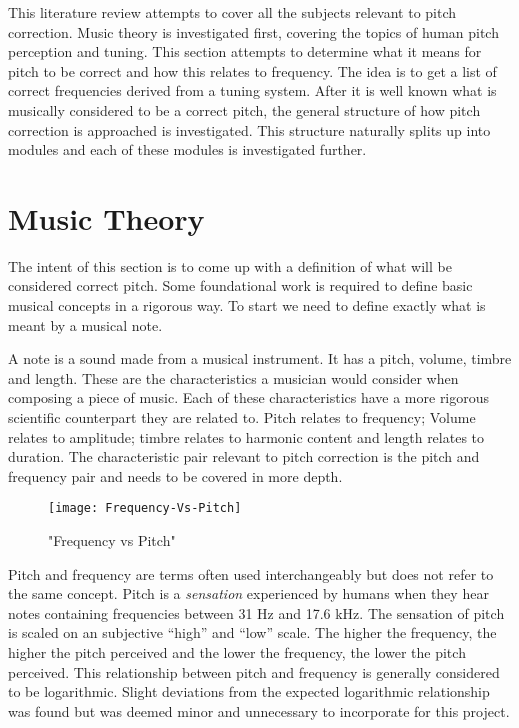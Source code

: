 
This literature review attempts to cover all the subjects relevant to pitch
correction. Music theory is investigated first, covering the topics of human
pitch perception and tuning. This section attempts to determine what it means for
pitch to be correct and how this relates to frequency. The idea is to get a list of
correct frequencies derived from a tuning system. After it is well known what
is musically considered to be a correct pitch, the general structure of how pitch
correction is approached is investigated. This structure naturally splits up into
modules and each of these modules is investigated further.

\section{Music Theory}

The intent of this section is to come up with a definition of what will be
considered correct pitch. Some foundational work is required to define basic
musical concepts in a rigorous way. To start we need to define exactly what is
meant by a musical note.

A note is a sound made from a musical instrument. It has a pitch, volume, timbre
and length. These are the characteristics a musician would consider when composing
a piece of music. Each of these characteristics have a more rigorous scientific
counterpart they are related to. Pitch relates to frequency; Volume relates to
amplitude; timbre relates to harmonic content and length relates to duration. The
characteristic pair relevant to pitch correction is the pitch and frequency pair
and needs to be covered in more depth.

\begin{wrapfigure}{L}{0.5\textwidth}
\texttt{[image: Frequency-Vs-Pitch]}
\caption{"Frequency vs Pitch"}
\label{fig:FrequencyVsPitch}
\end{wrapfigure}

Pitch and frequency are terms often used interchangeably but does not refer to the
same concept. Pitch is a \textit{sensation} experienced by humans when they hear
notes containing frequencies between 31 Hz and 17.6 kHz\cite{Hearing}. The
sensation of pitch is scaled on an subjective ``high'' and ``low'' scale. The
higher the frequency, the higher the pitch perceived and the lower the frequency,
the lower the pitch perceived. This relationship between pitch and frequency is
generally considered to be logarithmic. Slight deviations from the expected
logarithmic relationship was found\cite{PitchVsFrequency} but was deemed minor
and unnecessary to incorporate for this project.

